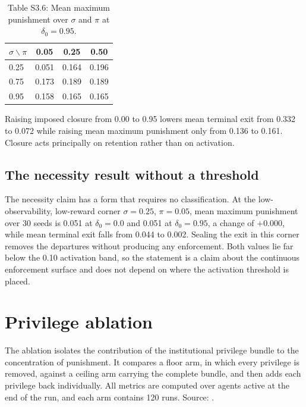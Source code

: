 \documentclass[12pt]{article}
\begin{document}
\begin{table}[htbp]
\centering
\small
\caption{Table S3.6: Mean maximum punishment over $\sigma$ and $\pi$ at $\delta_0=0.95$.}
\begin{tabular}{lccc}
\toprule
$\sigma \backslash \pi$ & 0.05 & 0.25 & 0.50 \\
\midrule
0.25 & 0.051 & 0.164 & 0.196 \\
0.75 & 0.173 & 0.189 & 0.189 \\
0.95 & 0.158 & 0.165 & 0.165 \\
\bottomrule
\end{tabular}
\end{table}

Raising imposed closure from 0.00 to 0.95 lowers mean terminal exit from 0.332
to 0.072 while raising mean maximum punishment only from 0.136 to 0.161. Closure
acts principally on retention rather than on activation.

\subsection{The necessity result without a threshold}

The necessity claim has a form that requires no classification. At the
low-observability, low-reward corner $\sigma=0.25$, $\pi=0.05$, mean maximum
punishment over 30 seeds is 0.051 at $\delta_0=0.0$ and 0.051 at
$\delta_0=0.95$, a change of $+0.000$, while mean terminal exit falls from 0.044
to 0.002. Sealing the exit in this corner removes the departures without
producing any enforcement. Both values lie far below the 0.10 activation band,
so the statement is a claim about the continuous enforcement surface and does
not depend on where the activation threshold is placed.

\clearpage

\section{Privilege ablation}
\label{sec:ablation}

The ablation isolates the contribution of the institutional privilege bundle to
the concentration of punishment. It compares a floor arm, in which every
privilege is removed, against a ceiling arm carrying the complete bundle, and
then adds each privilege back individually. All metrics are computed over agents
active at the end of the run, and each arm contains 120 runs. Source:
.
\end{document}
